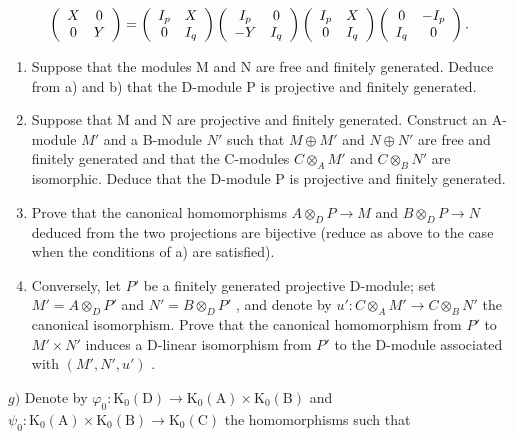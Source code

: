 \[
\left( \begin{array}{c c} X & 0 \\ 0 & Y \end{array} \right) = \left( \begin{array}{c c} I _ {p} & X \\ 0 & I _ {q} \end{array} \right) \left( \begin{array}{c c} I _ {p} & 0 \\ - Y & I _ {q} \end{array} \right) \left( \begin{array}{c c} I _ {p} & X \\ 0 & I _ {q} \end{array} \right) \left( \begin{array}{c c} 0 & - I _ {p} \\ I _ {q} & 0 \end{array} \right).
\]

\begin{enumerate}
\def\labelenumi{\alph{enumi})}
\setcounter{enumi}{2}
\item
  Suppose that the modules M and N are free and finitely generated. Deduce from a) and b) that the D-module P is projective and finitely generated.
\item
  Suppose that M and N are projective and finitely generated. Construct an A-module \(M'\) and a B-module \(N'\) such that \(M \oplus M'\) and \(N \oplus N'\) are free and finitely generated and that the C-modules \(C \otimes_{A} M'\) and \(C \otimes_{B} N'\) are isomorphic. Deduce that the D-module P is projective and finitely generated.
\item
  Prove that the canonical homomorphisms \(A \otimes_{D} P \to M\) and \(B \otimes_{D} P \to N\) deduced from the two projections are bijective (reduce as above to the case when the conditions of a) are satisfied).
\item
  Conversely, let \(P'\) be a finitely generated projective D-module; set \(M' = A \otimes_{D} P'\) and \(N' = B \otimes_{D} P'\) , and denote by \(u' : C \otimes_{A} M' \to C \otimes_{B} N'\) the canonical isomorphism. Prove that the canonical homomorphism from \(P'\) to \(M' \times N'\) induces a D-linear isomorphism from \(P'\) to the D-module associated with \((M', N', u')\) .
\end{enumerate}

\(g)\) Denote by \(\varphi_0:\mathrm{K}_0(\mathrm{D})\to \mathrm{K}_0(\mathrm{A})\times \mathrm{K}_0(\mathrm{B})\) and \(\psi_0:\mathrm{K}_0(\mathrm{A})\times \mathrm{K}_0(\mathrm{B})\to \mathrm{K}_0(\mathrm{C})\) the homomorphisms such that


